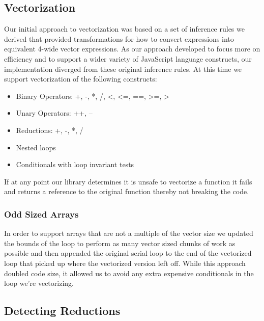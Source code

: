 \documentclass[conference]{IEEEtran}
\begin{document}
\subsection{Vectorization}
Our initial approach to vectorization was based on a set of inference rules we
derived that provided transformations for how to convert expressions into
equivalent 4-wide vector expressions. As our approach developed to focus more
on efficiency and to support a wider variety of JavaScript language constructs,
our implementation diverged from these original inference rules. At this time
we support vectorization of the following constructs:
\begin{itemize}
\item Binary Operators: +, -, *, /, \textless, \textless=, ==, \textgreater=, \textgreater
\item Unary Operators: ++, --
\item Reductions: +, -, *, /
\item Nested loops
\item Conditionals with loop invariant tests
\end{itemize}
If at any point our library determines it is unsafe to vectorize a function it
fails and returns a reference to the original function thereby not breaking the
code.

\subsubsection{Odd Sized Arrays}
In order to support arrays that are not a multiple of the vector size we
updated the bounds of the loop to perform as many vector sized chunks of work
as possible and then appended the original serial loop to the end of the
vectorized loop that picked up where the vectorized version left off. While
this approach doubled code size, it allowed us to avoid any extra expensive
conditionals in the loop we're vectorizing.


\subsection{Detecting Reductions}
\end{document}
